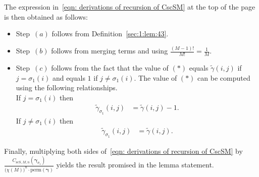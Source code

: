 \documentclass[journal,lettersize,twocolumn]{IEEEtran} %
\newcommand{\vect}[1]{ \bm{#1} }
\newcommand{\vgam}{ \vect{\gamma} }
\newcommand{\perm}{ \mathrm{perm} }
\newcommand{\CscSgen}[2]{C_{\mathrm{scS},#1,#2}}
\newcommand{\tgam}{\tilde{\gamma}}
\begin{document}
\begin{appendices}
%

The expression in~\eqref{eqn: derivations of recursion of CscSM} at the top of
the page is then obtained as follows:
\begin{itemize}

\item Step~$(a)$ follows from Definition~\ref{sec:1:lem:43}.

\item Step~$(b)$ follows from merging terms and using
  $\frac{(M-1)!}{M!} \! = \! \frac{1}{M}$.

\item Step~$(c)$ follows from the fact that the value of $(*)$ equals
  $\tgam(i,j)$ if $j = \sigma_1(i)$ and equals $1$ if $j \neq \sigma_1(i)$.
  The value of $(*)$ can be computed using the following relationships. \\
  If $j = \sigma_1(i)$ then
    \begin{align*}
      \tgam_{\sigma_1}(i,j)
        &= \tgam(i,j) - 1.
    \end{align*}
    If $j \neq \sigma_1(i)$ then
    \begin{align*}
      \tgam_{\sigma_1}(i,j)
        &= \tgam(i,j).
    \end{align*}

\end{itemize}
Finally, multiplying both sides of~\eqref{eqn: derivations of recursion of
  CscSM} by
$\frac{\CscSgen{M}{n}(\vgam_{\sigma_1})}{\bigl( \chi(M) \bigr)^{n} \cdot
  \perm( \vgam )}$ yields the result promised in the lemma statement.

%
%


\end{appendices}
\end{document}
